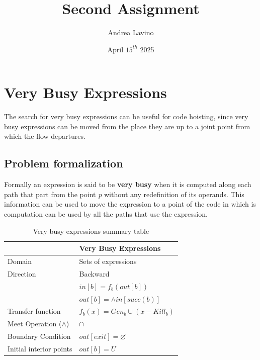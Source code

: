 \documentclass{article}
\title{Second Assignment}
\author{Andrea Lavino}
\date{April $15^{th}$ 2025}
\begin{document}
\maketitle

\clearpage

\tableofcontents

\clearpage

\section{Very Busy Expressions}

The search for very busy expressions can be useful for code hoisting, since very busy expressions can be moved from the place they are up to a joint point from which the flow departures.

\subsection{Problem formalization}

Formally an expression is said to be \textbf{very busy} when it is computed along each path that part from the point \textit{p} without any redefinition of its operands. This information can be used to move the expression to a point of the code in which is computation can be used by all the paths that use the expression.

\begin{table}[H]
	\centering
	\begin{tabular}{|p{}|p{}|}
		\hline
		                          & \textbf{Very Busy Expressions}     \\
		\hline
		Domain                    & Sets of expressions                \\
		\hline
		Direction                 & Backward                           \\
		                          & $in[b] = f_b(out[b])$              \\
		                          & $out[b] = \wedge in[succ(b)]$      \\
		\hline
		Transfer function         & $f_b(x) = Gen_b \cup (x - Kill_b)$ \\
		\hline
		Meet Operation ($\wedge$) & $\cap$                             \\
		\hline
		Boundary Condition        & $out[exit] = \varnothing$          \\
		\hline
		Initial interior points   & $out[b] = U$                       \\
		\hline
	\end{tabular}
	\caption{Very busy expressions summary table}
	\label{tab:dataflow_problem_x}
\end{table}
\end{document}
